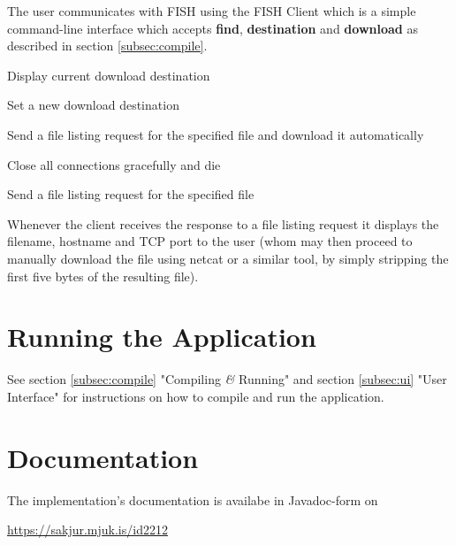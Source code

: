 \documentclass[11pt]{article}
\begin{document}
The user communicates with FISH using the FISH Client which is a simple
command-line interface which accepts
\textbf{find}, \textbf{destination} and \textbf{download} as described in
section \ref{subsec:compile}.

\begin{description}[align=right]
    \item[destination] Display current download destination
    \item[destination $<$path$>$] Set a new download destination
    \item[download $<$file$>$] Send a file listing request for the specified
        file and download it automatically
    \item[exit] Close all connections gracefully and die
    \item[find $<$file$>$] Send a file listing request for the specified file
\end{description}

Whenever the client receives the response to a file listing request it displays
the filename, hostname and TCP port to the user (whom may then proceed to
manually download the file using netcat or a similar tool, by simply stripping
the first five bytes of the resulting file).

\section{Running the Application}

See section \ref{subsec:compile} "Compiling \textit{\&} Running" and
section \ref{subsec:ui} "User Interface" for instructions on how to compile and
run the application.

\section{Documentation}

The implementation's documentation is availabe in Javadoc-form on

\url{https://sakjur.mjuk.is/id2212}
\end{document}

